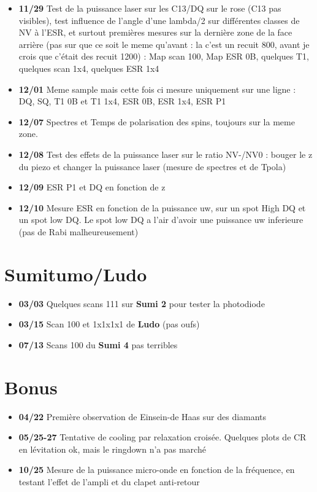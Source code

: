 \documentclass[a4paper]{article}
\begin{document}
\begin{itemize}
\item \textbf{11/29} Test de la puissance laser sur les C13/DQ sur le rose (C13 pas visibles), test influence de l'angle d'une lambda/2 sur différentes classes de NV à l'ESR, et surtout premières mesures sur la dernière zone de la face arrière (pas sur que ce soit le meme qu'avant : la c'est un recuit 800, avant je crois que c'était des recuit 1200) : Map scan 100, Map ESR 0B, quelques T1, quelques scan 1x4, quelques ESR 1x4
\item \textbf{12/01} Meme sample mais cette fois ci mesure uniquement sur une ligne : DQ, SQ, T1 0B et T1 1x4, ESR 0B, ESR 1x4, ESR P1
\item \textbf{12/07} Spectres et Temps de polarisation des spins, toujours sur la meme zone.
\item \textbf{12/08} Test des effets de la puissance laser sur le ratio NV-/NV0 : bouger le z du piezo et changer la puissance laser (mesure de spectres et de Tpola)
\item \textbf{12/09} ESR P1 et DQ en fonction de z
\item \textbf{12/10} Mesure ESR en fonction de la puissance uw, sur un spot High DQ et un spot low DQ. Le spot low DQ a l'air d'avoir une puissance uw inferieure (pas de Rabi malheureusement)
\end{itemize}

\section{Sumitumo/Ludo}
\begin{itemize}
\item \textbf{03/03} Quelques scans 111 sur \textbf{Sumi 2} pour tester la photodiode
\item \textbf{03/15} Scan 100 et 1x1x1x1 de \textbf{Ludo} (pas oufs)
\item \textbf{07/13} Scans 100 du \textbf{Sumi 4} pas terribles
\end{itemize}

\section{Bonus}
\begin{itemize}
\item \textbf{04/22} Première observation de Einsein-de Haas sur des diamants
\item \textbf{05/25-27} Tentative de cooling par relaxation croisée. Quelques plots de CR en lévitation ok, mais le ringdown n'a pas marché
\item \textbf{10/25} Mesure de la puissance micro-onde en fonction de la fréquence, en testant l'effet de l'ampli et du clapet anti-retour

\end{itemize}
\end{document}
